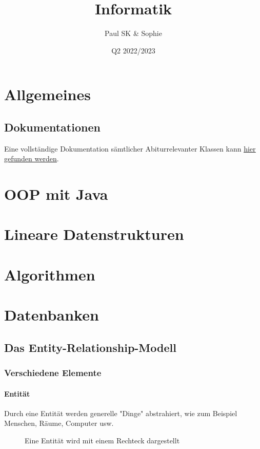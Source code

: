 \documentclass{article}
\title{Informatik}
\date{Q2 2022/2023}
\author{Paul SK \& Sophie}
\begin{document}
	\maketitle
	\newpage


	\section{Allgemeines}
	\subsection{Dokumentationen}
	Eine vollständige Dokumentation sämtlicher Abiturrelevanter Klassen kann \href{https://www.schulentwicklung.nrw.de/lehrplaene/upload/klp\_SII/if/Dokumentation\_ZA-IF\_GK-LK\_ab\_2018\_2021\_12\_22.pdf}{\underline{hier gefunden werden}}.

	\section{OOP mit Java}

	\section{Lineare Datenstrukturen}

	\section{Algorithmen}

	\section{Datenbanken}
	\subsection{Das Entity-Relationship-Modell}
	\subsubsection{Verschiedene Elemente}
	\paragraph{Entität}
	Durch eine Entität werden generelle "Dinge" abstrahiert, wie zum Beispiel Menschen, Räume, Computer usw.

	\begin{figure}[h!]
		\caption{Eine Entität wird mit einem Rechteck dargestellt}
	\end{figure}	
\end{document}

